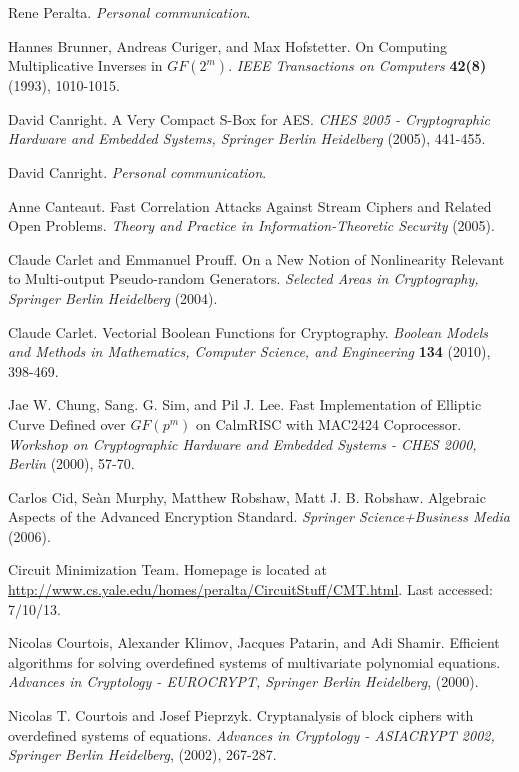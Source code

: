 \documentclass[11pt,american]{report}
\begin{document}
\begin{thebibliography}{9}
 Rene Peralta. \emph{Personal communication}.

 Hannes Brunner, Andreas Curiger, and Max Hofstetter. On Computing Multiplicative Inverses in $GF(2^m)$. \emph{IEEE Transactions on Computers} \textbf{42(8)} (1993), 1010-1015.

 David Canright. A Very Compact S-Box for AES. \emph{CHES 2005 - Cryptographic Hardware and Embedded Systems, Springer Berlin Heidelberg} (2005), 441-455.

 David Canright. \emph{Personal communication}. 

 Anne Canteaut. Fast Correlation Attacks Against Stream Ciphers and Related Open Problems. \emph{Theory and Practice in Information-Theoretic Security} (2005).

 Claude Carlet and Emmanuel Prouff. On a New Notion of Nonlinearity Relevant to Multi-output Pseudo-random Generators. \emph{Selected Areas in Cryptography, Springer Berlin Heidelberg} (2004).

 Claude Carlet. Vectorial Boolean Functions for Cryptography. \emph{Boolean Models and Methods in Mathematics, Computer Science, and Engineering} \textbf{134} (2010), 398-469.

 Jae W. Chung, Sang. G. Sim, and Pil J. Lee. Fast Implementation of Elliptic Curve Defined over $GF(p^m)$ on CalmRISC with MAC2424 Coprocessor. \emph{Workshop on Cryptographic Hardware and Embedded Systems - CHES 2000, Berlin} (2000), 57-70.

 Carlos Cid, Se\`{a}n Murphy, Matthew Robshaw, Matt J. B. Robshaw. Algebraic Aspects of the Advanced Encryption Standard. \emph{Springer Science+Business Media} (2006).

 Circuit Minimization Team. Homepage is located at \url{http://www.cs.yale.edu/homes/peralta/CircuitStuff/CMT.html}. Last accessed: 7/10/13. 

 Nicolas Courtois, Alexander Klimov, Jacques Patarin, and Adi Shamir. Efficient algorithms for solving overdefined systems of multivariate polynomial equations. \emph{Advances in Cryptology - EUROCRYPT, Springer Berlin Heidelberg}, (2000).

 Nicolas T. Courtois and Josef Pieprzyk. Cryptanalysis of block ciphers with overdefined systems of equations. \emph{Advances in Cryptology - ASIACRYPT 2002, Springer Berlin Heidelberg}, (2002), 267-287.


\end{thebibliography}
\end{document}
